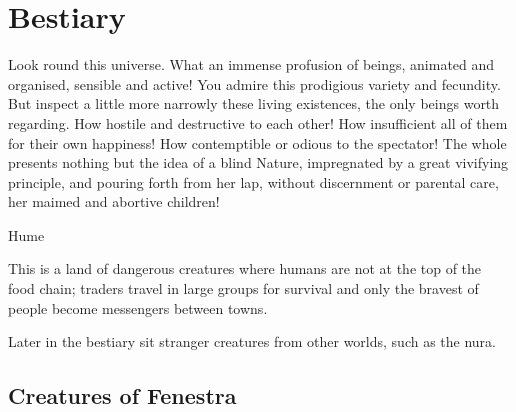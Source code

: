 \chapter{Bestiary}

\epigraph{Look round this universe. What an immense profusion of beings, animated and organised, sensible and active! You admire this prodigious variety and fecundity. But inspect a little more narrowly these living existences, the only beings worth regarding. How hostile and destructive to each other! How insufficient all of them for their own happiness! How contemptible or odious to the spectator! The whole presents nothing but the idea of a blind Nature, impregnated by a great vivifying principle, and pouring forth from her lap, without discernment or parental care, her maimed and abortive children!}{Hume}

\setcounter{bestiarychapter}{\thechapter}

This is a land of dangerous creatures where humans are not at the top of the food chain; traders travel in large groups for survival and only the bravest of people become messengers between towns.

Later in the bestiary sit stranger creatures from other worlds, such as the nura.

\section{Creatures of Fenestra}

